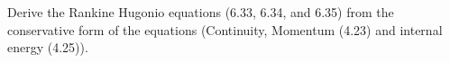 
    Derive the Rankine Hugonio equations (6.33, 6.34, and 6.35) from the conservative form of the
    equations (Continuity, Momentum (4.23) and internal energy (4.25)).

